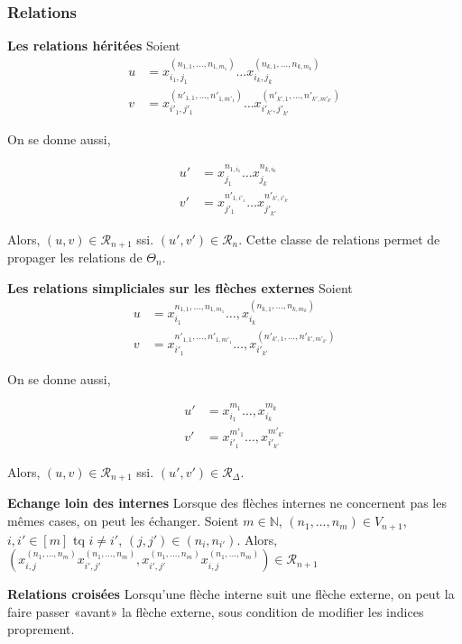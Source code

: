 \documentclass{article}
\theoremstyle{definition}
\theoremstyle{definition}
\theoremstyle{remark}
\begin{document}
\subsubsection{Relations}
\textbf{Les relations héritées}
Soient
\[
\begin{split}
u & = x^{(n_{1,1},\dots,n_{1,m_1})}_{i_1,j_1}\dots x^{(n_{k,1},\dots,n_{k,m_k})}_{i_k,j_k}\\
v & = x^{(n'_{1,1},\dots,n'_{1,m'_1})}_{i'_1,j'_1}\dots x^{(n'_{k',1},\dots,n'_{k',{m'}_{k'}})}_{{i'}_{k'},{j'}_{k'}}
\end{split}
\]

On se donne aussi,

\[\begin{split}
u' & = x^{n_{1,i_1}}_{j_1}\dots x^{n_{k,i_k}}_{j_k}\\
v' & = x^{n'_{1,i'_1}}_{j'_1}\dots x^{n'_{k',{i'}_{k'}}}_{{j'}_{k'}}
\end{split}
\]

Alors, $(u,v)\in \mathcal R_{n+1}$ ssi. $(u',v')\in\mathcal R_n$.
Cette classe de relations permet de propager les relations de $\Theta_n$.

\textbf{Les relations simpliciales sur les flèches externes}
Soient
\[
\begin{split}
    u & = x^{n_{1,1},\dots,n_{1,m_1}}_{i_1}\dots,x^{(n_{k,1},\dots,n_{k,m_k})}_{i_k}\\
    v & = x^{n'_{1,1},\dots,n'_{1,m'_1}}_{i'_1}\dots,x^{(n'_{k',1},\dots,n'_{k',{m'}_{k'}})}_{{i'}_{k'}}
\end{split}
\]

On se donne aussi,

\[
\begin{split}
    u' & = x^{m_1}_{i_1}\dots,x^{m_k}_{i_k}\\
    v' & = x^{m'_1}_{i'_1}\dots,x^{m'_{k'}}_{{i'}_{k'}}
\end{split}
\]

Alors, $(u,v)\in\mathcal R_{n+1}$ ssi. $(u',v')\in\mathcal R_\Delta$.

\textbf{Echange loin des internes}
Lorsque des flèches internes ne concernent pas les mêmes cases, on peut les échanger.
Soient $m\in\mathbb N$, $(n_1,\dots,n_m) \in V_{n+1}$, $i,i'\in[m]$ tq $i\neq i'$, $(j,j')\in(n_i,n_{i'})$.
Alors, $(x^{(n_1,\dots,n_m)}_{i,j}x^{(n_1,\dots,n_m)}_{i',j'},x^{(n_1,\dots,n_m)}_{i',j'}x^{(n_1,\dots,n_m)}_{i,j}) \in \mathcal R_{n+1}$

\textbf{Relations croisées}
Lorsqu'une flèche interne suit une flèche externe, on peut la faire passer «avant» la flèche externe, sous condition de modifier les indices proprement.
\end{document}
